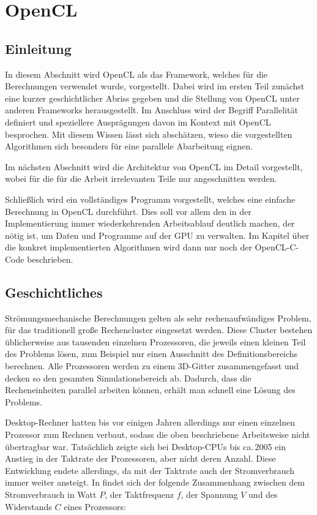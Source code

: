 \section{OpenCL}

\subsection{Einleitung}

In diesem Abschnitt wird OpenCL als das Framework, welches für die Berechnungen
verwendet wurde, vorgestellt. Dabei wird im ersten Teil zunächst eine kurzer
geschichtlicher Abriss gegeben und die Stellung von OpenCL unter anderen
Frameworks herausgestellt. Im Anschluss wird der Begriff Parallelität definiert
und speziellere Ausprägungen davon im Kontext mit OpenCL besprochen. Mit diesem
Wissen lässt sich abschätzen, wieso die vorgestellten Algorithmen sich besonders
für eine parallele Abarbeitung eignen.

Im nächsten Abschnitt wird die Architektur von OpenCL im Detail vorgestellt,
wobei für die für die Arbeit irrelevanten Teile nur angeschnitten werden.

Schließlich wird ein vollständiges Programm vorgestellt, welches eine einfache
Berechnung in OpenCL durchführt. Dies soll vor allem den in der Implementierung
immer wiederkehrenden Arbeitsablauf deutlich machen, der nötig ist, um Daten und
Programme auf der GPU zu verwalten. Im Kapitel über die konkret implementierten
Algorithmen wird dann nur noch der OpenCL-C-Code beschrieben.

\subsection{Geschichtliches}

Strömungsmechanische Berechnungen gelten als sehr rechenaufwändiges
Problem, für das traditionell große Rechencluster eingesetzt werden.
Diese Cluster bestehen üblicherweise aus tausenden einzelnen
Prozessoren, die jeweils einen kleinen Teil des Problems lösen, zum
Beispiel nur einen Ausschnitt des Definitionsbereichs berechnen. Alle
Prozessoren werden zu einem 3D-Gitter zusammengefasst und decken so
den gesamten Simulationsbereich ab. Dadurch, dass die Recheneinheiten
parallel arbeiten können, erhält man schnell eine Lösung des Problems.

Desktop-Rechner hatten bis vor einigen Jahren allerdings nur einen
einzelnen Prozessor zum Rechnen verbaut, sodass die oben beschriebene
Arbeitsweise nicht übertragbar war. Tatsächlich zeigte sich bei
Desktop-CPUs bis ca.\,2005 ein Anstieg in der Taktrate der
Prozessoren, aber nicht deren Anzahl. Diese Entwicklung endete allerdings, da mit
der Taktrate auch der Stromverbrauch immer weiter ansteigt. In
\cite{Chandrakasan1995} findet sich der folgende Zusammenhang zwischen
dem Stromverbrauch in Watt $P$, der Taktfrequenz $f$, der Spannung $V$ und
des Widerstands $C$ eines Prozessors:

